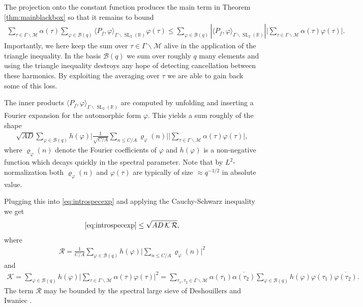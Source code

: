 \documentclass[12pt]{amsart}
\theoremstyle{definition}
\theoremstyle{remark}
\numberwithin{equation}{section}
\newcommand{\B}{\mathcal{B}}
\newcommand{\R}{{\mathbb R}}
\newcommand{\1}{{\mathbf 1}}
\newcommand{\SL}{\operatorname{SL}_2}
\begin{document}
The projection onto the constant function produces the main term in Theorem \ref{thm:mainblackbox} so that it remains to bound
\begin{align}\label{eq:introspecexp}
  \sum_{\tau \in  \Gamma \backslash \mathcal{M} } \alpha(\tau)  \sum_{\varphi \in \B(q)} \langle P_f, \varphi \rangle_{\Gamma \backslash \SL(\R)} \varphi(\tau) \leq    \sum_{\varphi \in \B(q)} |\langle P_f, \varphi \rangle_{\Gamma \backslash \SL(\R)}| \bigg| \sum_{\tau \in  \Gamma \backslash \mathcal{M} } \alpha(\tau )\varphi(\tau)   \bigg|.
\end{align}
Importantly, we here keep the sum over $\tau \in  \Gamma \backslash \mathcal{M}$ alive in the application of the triangle inequality. In the basis $\B(q)$ we sum over roughly $q$ many elements and using the triangle inequality destroys any hope of detecting cancellation between these harmonics. By exploiting the averaging over $\tau$ we are able to gain back some of this loss.

The inner products $\langle P_f, \varphi \rangle_{\Gamma \backslash \SL(\R)}$ are computed by unfolding and inserting a Fourier expansion for the automorphic form $\varphi$. This yields a sum roughly of the  shape
\begin{align}\label{eq:introinnerprod}
 \sqrt{AD} \sum_{\varphi \in \B(q)} h(\varphi)\bigg|  \frac{1}{\sqrt{C/A}} \sum_{n \leq C/A} \varrho_{\varphi}(n) \bigg| \bigg| \sum_{\tau \in  \Gamma \backslash \mathcal{M} } \alpha(\tau )\varphi(\tau)   \bigg|,
\end{align}
where $\varrho_{\varphi}(n)$ denote the Fourier coefficients of $\varphi$ and $h(\varphi)$ is a non-negative function which decays quickly in  the spectral parameter. Note that by $L^2$-normalization both $\varrho_{\varphi}(n)$ and $\varphi(\tau)$ are typically of size  $\approx q^{-1/2}$ in absolute value. 

Plugging this into \eqref{eq:introspecexp} and applying the Cauchy-Schwarz inequality we get
\begin{align*}
   \eqref{eq:introspecexp} \leq \sqrt{AD \, \mathcal{K}\, \mathcal{R}},
\end{align*}
where
\begin{align*}
    \mathcal{R} = \frac{1}{C/A} \sum_{\varphi \in \B(q)} h(\varphi)\bigg|   \sum_{n \leq C/A} \varrho_{\varphi}(n) \bigg|^2 
\end{align*}
and 
\begin{align}\label{eq:introKfirst} 
    \mathcal{K} =\sum_{\varphi \in \B(q)}   h(\varphi)\bigg| \sum_{\tau \in  \Gamma \backslash \mathcal{M} } \alpha(\tau )\varphi(\tau)   \bigg|^2 =  \sum_{\tau_1,\tau_2 \in  \Gamma \backslash \mathcal{M} } \alpha(\tau_1 ) \overline{\alpha(\tau_2)} \sum_{\varphi \in \B(q)}  h(\varphi) \varphi(\tau_1) \overline{\varphi(\tau_2) }. 
\end{align}
The term $\mathcal{R}$ may be bounded by the spectral large sieve of Deshouillers and Iwaniec \cite{deshoullieriwaniec}. 
\end{document}

